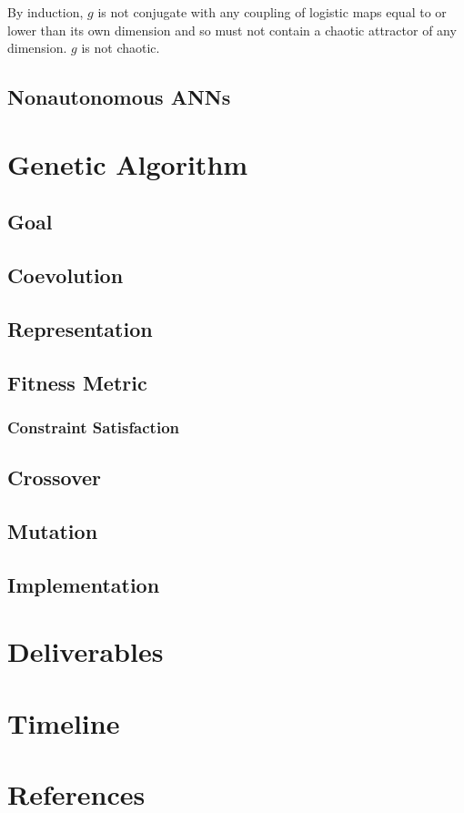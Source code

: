 \documentclass[12pt]{article}
\begin{document}
By induction, $g$ is not conjugate with any coupling of logistic maps equal
to or lower than its own dimension and so must not contain a chaotic attractor
of any dimension.  $g$ is not chaotic.

\subsection{Nonautonomous ANNs}
\section{Genetic Algorithm}
\subsection{Goal}
\subsection{Coevolution}
\subsection{Representation}
\subsection{Fitness Metric}
\subsubsection{Constraint Satisfaction}
\subsection{Crossover}
\subsection{Mutation}
\subsection{Implementation}
\section{Deliverables}
\section{Timeline}
\section{References}
\end{document}
